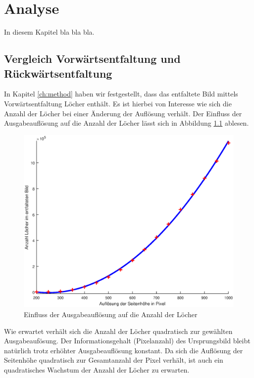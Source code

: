 \chapter{Analyse}
\label{ch:analysis}
In diesem Kapitel bla bla bla.


\section{Vergleich Vorwärtsentfaltung und Rückwärtsentfaltung}
In Kapitel \ref{ch:method} haben wir festgestellt, dass das entfaltete Bild mittels Vorwärtsentfaltung Löcher enthält. Es ist hierbei von Interesse wie sich die Anzahl der Löcher bei einer Änderung der Auflösung verhält. Der Einfluss der Ausgabeauflösung auf die Anzahl der Löcher lässt sich in Abbildung \ref{fig:influenceRes} ablesen. 

\begin{figure}[!htb]
	\centering
	\includegraphics[width=\textwidth]{images/numberOfHoles.eps}
	\caption{Einfluss der Ausgabeauflösung auf die Anzahl der Löcher}
	\label{fig:influenceRes}
\end{figure}

Wie erwartet verhält sich die Anzahl der Löcher quadratisch zur gewählten Ausgabeaufösung. Der Informationsgehalt (Pixelanzahl) des Ursprungsbild bleibt natürlich trotz erhöhter Ausgabeauflösung konstant. Da sich die Auflösung der Seitenhöhe quadratisch zur Gesamtanzahl der Pixel verhält, ist auch ein quadratisches Wachstum der Anzahl der Löcher zu erwarten. 
\bigskip

